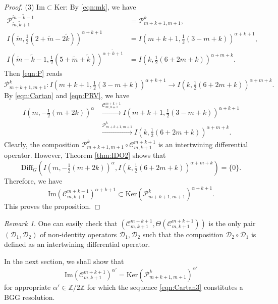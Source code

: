 \documentclass[reqno,11pt]{amsart}
\theoremstyle{remark}
\newtheorem{rem}[equation]{Remark}
\numberwithin{equation}{section}
\newcommand{\ga}{\alpha}
\newcommand{\Z}{\mathbb{Z}}
\newcommand{\Cal}{\mathcal}
\renewcommand{\Im}{\mathrm{Im}}
\newcommand{\To}{\longrightarrow}
\newcommand{\Diff}{\mathrm{Diff}}
\newcommand{\D}{\Cal{D}}
\newcommand{\wk}{\widetilde{k}}
\newcommand{\wm}{\widetilde{m}}
\newcommand{\Ker}{\mathrm{Ker}}
\begin{document}
\begin{proof}
(3) $\Im \subset \Ker$: 
By \eqref{eqn:mk}, we have
\begin{align*}
\Cal{P}^{\wm-\wk-1}_{\wm,\wk+1}&=\Cal{P}^{k}_{m+k+1,m+1},\\[3pt]
I(\wm, \tfrac{1}{2}(2+\wm-2\wk))^{\ga+k+1} 
&= I(m+k+1, \tfrac{1}{2}(3-m+k))^{\ga+k+1}, \\[3pt]
I(\wm-\wk-1, \tfrac{1}{2}(5+\wm+\wk))^{\ga+\wk+1} &= 
I(k, \tfrac{1}{2}(6+2m+k))^{\ga+m+k}.
\end{align*}
Then \eqref{eqn:P} reads
\begin{equation}\label{eqn:PRV2}
\Cal{P}^{k}_{m+k+1,m+1}\colon 
I(m+k+1, \tfrac{1}{2}(3-m+k))^{\ga+k+1}
\To
I(k, \tfrac{1}{2}(6+2m+k))^{\ga+m+k}. 
\end{equation}
By \eqref{eqn:Cartan} and \eqref{eqn:PRV}, we have
\begin{equation}\label{eqn:Cartan3}
\begin{aligned}
I(m, -\tfrac{1}{2}(m+2k))^\ga
&\stackrel{\Cal{C}^{m+k+1}_{m,k+1}}{\To}
I(m+k+1, \tfrac{1}{2}(3-m+k))^{\ga+k+1}\\[5pt]
&\stackrel{\Cal{P}^{k}_{m+k+1,m+1}}{\To}
I(k, \tfrac{1}{2}(6+2m+k))^{\ga+m+k}.
\end{aligned}
\end{equation}
Clearly, the composition $\Cal{P}^{k}_{m+k+1,m+1}\circ \Cal{C}^{m+k+1}_{m,k+1}$ is 
an intertwining differential operator. However,  Theorem \ref{thm:IDO2} shows that
\begin{equation*}
\Diff_G(I(m, -\tfrac{1}{2}(m+2k))^\ga, 
I(k, \tfrac{1}{2}(6+2m+k))^{\ga+m+k}) = \{0\}.
\end{equation*}
Therefore, we have 
\begin{equation*}
\Im\left(\Cal{C}^{m+k+1}_{m,k+1}\right)^{\ga+k+1} 
\subset 
\Ker\left(\Cal{P}^{k}_{m+k+1,m+1}\right)^{\ga+k+1}.
\end{equation*}
This proves the proposition.
\end{proof}

\begin{rem}
One can easily check that $(\Cal{C}^{m+k+1}_{m,k+1},
\Theta(\Cal{C}^{m+k+1}_{m,k+1}))$ is the only pair 
$(\D_1, \D_2)$ of non-identity operators $\D_1, \D_2$
such that the composition $\D_2 \circ \D_1$ is defined as an intertwining differential operator.
\end{rem}

In the next section, we shall show that 
\begin{equation}\label{eqn:CP}
\Im\left(\Cal{C}^{m+k+1}_{m,k+1}\right)^{\ga'} 
=
\Ker\left(\Cal{P}^{k}_{m+k+1,m+1}\right)^{\ga'}
\end{equation}
for appropriate $\ga'  \in \Z/2\Z$ for which the sequence \eqref{eqn:Cartan3} 
constitutes a BGG resolution.
\end{document}

